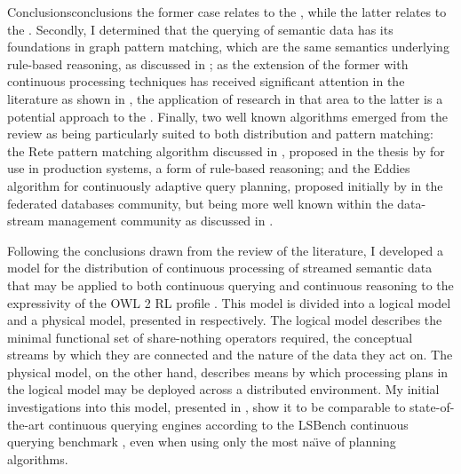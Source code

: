 \begin{nestedsection}{Conclusions}{conclusions}
	the former case relates to the , while the latter relates to the .
	Secondly, I determined that the querying of semantic data has its foundations in graph pattern matching, which are the same semantics underlying rule-based reasoning, as discussed in ;
	as the extension of the former with continuous processing techniques has received significant attention in the literature as shown in , the application of research in that area to the latter is a potential approach to the .
	Finally, two well known algorithms emerged from the review as being particularly suited to both distribution and pattern matching:
	the Rete pattern matching algorithm discussed in , proposed in the thesis by \citet{forgy79} for use in production systems, a form of rule-based reasoning;
	and the Eddies algorithm for continuously adaptive query planning, proposed initially by \citet{eddies} in the federated databases community, but being more well known within the data-stream management community as discussed in .

	Following the conclusions drawn from the review of the literature, I developed a model for the distribution of continuous processing of streamed semantic data that may be applied to both continuous querying and continuous reasoning to the expressivity of the OWL 2 RL profile \citep{w3cowl2profiles}.
	This model is divided into a logical model and a physical model, presented in  respectively.
	The logical model describes the minimal functional set of share-nothing operators required, the conceptual streams by which they are connected and the nature of the data they act on.
	The physical model, on the other hand, describes means by which processing plans in the logical model may be deployed across a distributed environment.
	My initial investigations into this model, presented in , show it to be comparable to state-of-the-art continuous querying engines according to the LSBench continuous querying benchmark \citep{LSBench}, even when using only the most na\"{\i}ve of planning algorithms.


\end{nestedsection}
